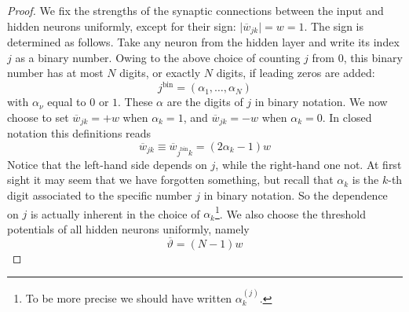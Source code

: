 \begin{proof}
We fix the strengths of the synaptic connections between the input and hidden neurons uniformly, except for their sign: $\lvert\overline{w}_{jk}\rvert=w=1$. The sign is determined as follows. Take any neuron from the hidden layer and write its index $j$ as a binary number. Owing to the above choice of counting $j$ from $0$, this binary number has at most $N$ digits, or exactly $N$ digits, if leading zeros are added:
\begin{equation}
j^{\text{bin}}=(\alpha_1,\ldots,\alpha_N)
\end{equation}
with $\alpha_\nu$ equal to $0$ or $1$. These $\alpha$ are the digits of $j$ in binary notation. We now choose to set $\overline{w}_{jk}=+w$ when $\alpha_k=1$, and $\overline{w}_{jk}=-w$ when $\alpha_k=0$. In closed notation this definitions reads
\begin{equation}
\overline{w}_{jk}\equiv\overline{w}_{j^{\text{bin}}k}=(2\alpha_k-1)w
\end{equation}
Notice that the left-hand side depends on $j$, while the right-hand one not. At first sight it may seem that we have forgotten something, but recall that $\alpha_k$ is the $k$-th digit associated to the specific number $j$ in binary notation. So the dependence on $j$ is actually inherent in the choice of $\alpha_k$\footnote{To be more precise we should have written $\alpha_k^{(j)}$.}. We also choose the threshold potentials of all hidden neurons uniformly, namely
\begin{equation}
\overline{\vartheta}=(N-1)w
\end{equation}


\end{proof}

